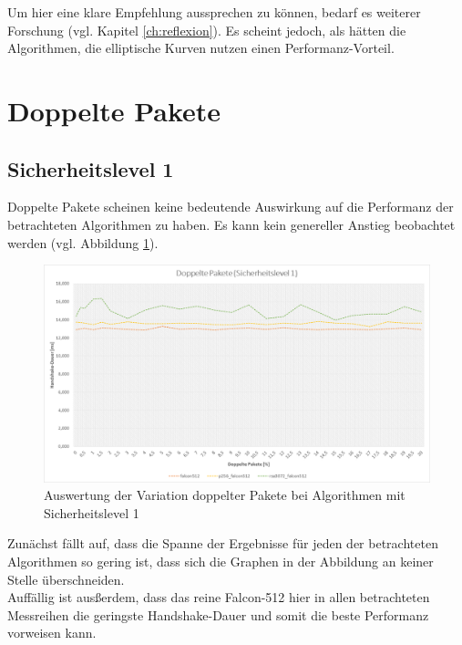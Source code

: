 		Um hier eine klare Empfehlung aussprechen zu können, bedarf es weiterer Forschung (vgl. Kapitel \ref{ch:reflexion}). Es scheint jedoch, als hätten 				die Algorithmen, die elliptische Kurven nutzen einen Performanz-Vorteil.
		
	\section{Doppelte Pakete}
	\label{sec:ergebnis:doppelt}
	
		\subsection{Sicherheitslevel 1}
		\label{subsec:ergebnis:doppelt:sl1}
		
		Doppelte Pakete scheinen keine bedeutende Auswirkung auf die Performanz der betrachteten Algorithmen zu haben. Es kann kein genereller Anstieg 					beobachtet werden (vgl. Abbildung \ref{fig:ergebnis:doppelt:sl1}).
		
		\begin{figure}[htbp]
			\centering
			\includegraphics[width=\textwidth]{../auswertung/doppelt_sl1.png}
			\caption{Auswertung der Variation doppelter Pakete bei Algorithmen mit Sicherheitslevel 1}
			\label{fig:ergebnis:doppelt:sl1}
		\end{figure}
		
		Zunächst fällt auf, dass die Spanne der Ergebnisse für jeden der betrachteten Algorithmen so gering ist, dass sich die Graphen in der Abbildung an 				keiner Stelle überschneiden.\\
		
		Auffällig ist ausßerdem, dass das reine Falcon-512 hier in allen betrachteten Messreihen die geringste Handshake-Dauer und somit die beste 						Performanz vorweisen kann.\\
		
